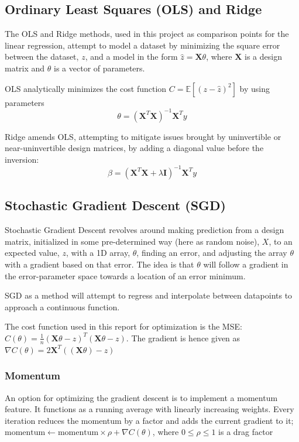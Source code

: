 \documentclass[a4paper, UKenglish]{article}
\newcommand{\0}{\mathbf{0}}
\newcommand{\1}{\mathbf{1}}
\begin{document}
\subsection{Ordinary Least Squares (OLS) and Ridge}
The OLS and Ridge methods, used in this project as comparison points for the linear regression, attempt to model a dataset by minimizing the square error between the dataset, $z$, and a model in the form $\hat{z} = \textbf{X}\theta$, where $\textbf{X}$ is a design matrix and $\theta$ is a vector of parameters.

OLS analytically minimizes the cost function $C = \mathbb{E}[(z - \hat{z})^2]$ by using parameters $$\theta = \left(\textbf{X}^T\textbf{X}\right)^{-1} \textbf{X}^T y $$

Ridge amends OLS, attempting to mitigate issues brought by uninvertible or near-uninvertible design matrices, by adding a diagonal value before the inversion: $$\beta = \left(\textbf{X}^T\textbf{X} + \lambda \textbf{I}\right)^{-1} \textbf{X}^T y $$
\subsection{Stochastic Gradient Descent (SGD)}
Stochastic Gradient Descent revolves around making prediction from a design matrix, initialized in some pre-determined way (here as random noise), $X$, to an expected value, $z$, with a 1D array, $\theta$, finding an error, and adjusting the array $\theta$ with a gradient based on that error. The idea is that $\theta$ will follow a gradient in the error-parameter space towards a location of an error minimum.

SGD as a method will attempt to regress and interpolate between datapoints to approach a continuous function.

The cost function used in this report for optimization is the MSE: $C(\theta) = \frac{1}{n}(\textbf{X}\theta - z)^T(\textbf{X}\theta - z)$. The gradient is hence given as $\nabla C(\theta) = 2\textbf{X}^T((\textbf{X}\theta) - z)$


\subsubsection{Momentum}
An option for optimizing the gradient descent is to implement a momentum feature. It functions as a running average with linearly increasing weights. Every iteration reduces the momentum by a factor and adds the current gradient to it; $\text{momentum} \leftarrow \text{momentum}\times \rho + \nabla C(\theta) $, where $0 \leq \rho \leq 1$ is a drag factor 
\end{document}
